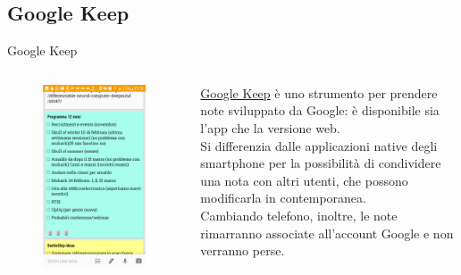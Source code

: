 \documentclass{beamer}
\begin{document}
\subsection{Google Keep}
\begin{frame}{Google Keep}
\begin{columns}
\begin{column}{0.5\linewidth}
\begin{figure}[h!]
\includegraphics[height=0.8\textheight]{immagini/keep.png}
\end{figure}
\end{column}
\begin{column}{0.5\linewidth}
\underline{Google Keep} è uno strumento per prendere note sviluppato da Google: è disponibile sia l'app che la versione web. \\Si differenzia dalle applicazioni native degli smartphone per la possibilità di condividere una nota con altri utenti, che possono modificarla in contemporanea. \\Cambiando telefono, inoltre, le note rimarranno associate all'account Google e non verranno perse.
\end{column}
\end{columns}
\end{frame}
\end{document}

